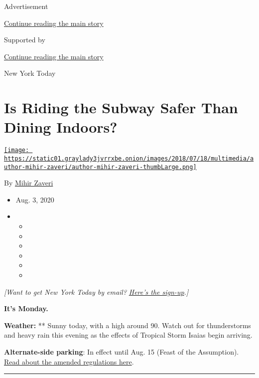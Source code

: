 Advertisement

\protect\hyperlink{after-top}{Continue reading the main story}

Supported by

\protect\hyperlink{after-sponsor}{Continue reading the main story}

New York Today

\hypertarget{is-riding-the-subway-safer-than-dining-indoors}{%
\section{Is Riding the Subway Safer Than Dining
Indoors?}\label{is-riding-the-subway-safer-than-dining-indoors}}

\href{https://www.nytimes3xbfgragh.onion/by/mihir-zaveri}{\texttt{[image: https://static01.graylady3jvrrxbe.onion/images/2018/07/18/multimedia/author-mihir-zaveri/author-mihir-zaveri-thumbLarge.png]}}

By \href{https://www.nytimes3xbfgragh.onion/by/mihir-zaveri}{Mihir
Zaveri}

\begin{itemize}
\item
  Aug. 3, 2020
\item
  \begin{itemize}
  \item
  \item
  \item
  \item
  \item
  \item
  \end{itemize}
\end{itemize}

\emph{{[}Want to get New York Today by email?}
\href{https://www.nytimes3xbfgragh.onion/newsletters/newyorktoday}{\emph{Here's
the sign-up}}\emph{.{]}}

\textbf{It's Monday.}

\textbf{Weather:} ** Sunny today, with a high around 90. Watch out for
thunderstorms and heavy rain this evening as the effects of Tropical
Storm Isaias begin arriving.

\textbf{Alternate-side parking}: In effect until Aug. 15 (Feast of the
Assumption).
\href{https://www1.nyc.gov/html/dot/html/motorist/alternate-side-parking.shtml\#reform}{Read
about the amended regulations here}.

\begin{center}\rule{0.5\linewidth}{\linethickness}\end{center}

